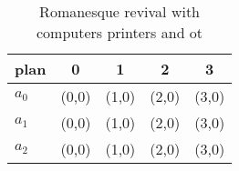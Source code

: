 \documentclass[a4paper]{article}
\begin{document}
\begin{table}
\begin{adjustbox}{width=0.5\columnwidth}
\begin{tabular}{|l|l|l|l|l|}
\hline
\textbf{plan} & \multicolumn{1}{c|}{\textbf{0}} & \multicolumn{1}{c|}{\textbf{1}} & \multicolumn{1}{c|}{\textbf{2}} & \multicolumn{1}{c|}{\textbf{3}} \\ \hline
\textbf{$a_0$}  & (0,0) & (1,0) & (2,0) & (3,0) \\ \hline
\textbf{$a_1$}  & (0,0) & (1,0) & (2,0) & (3,0) \\ \hline
\textbf{$a_2$}  & (0,0) & (1,0) & (2,0) & (3,0) \\ \hline
\end{tabular}
\end{adjustbox}
\caption{Romanesque revival with computers printers and ot
}
\end{table}
\end{document}
